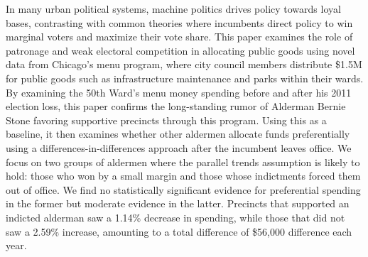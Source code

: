 \begin{spacing}{1.0}
    In many urban political systems, machine politics drives policy towards loyal bases, contrasting with common theories where incumbents direct policy to win marginal voters and maximize their vote share.
    This paper examines the role of patronage and weak electoral competition in allocating public goods using novel data from Chicago's menu program, where city council members distribute \$1.5M for public goods such as infrastructure maintenance and parks within their wards.
    By examining the 50th Ward's menu money spending before and after his 2011 election loss, this paper confirms the long-standing rumor of Alderman Bernie Stone favoring supportive precincts through this program.
    Using this as a baseline, it then examines whether other aldermen allocate funds preferentially using a differences-in-differences approach after the incumbent leaves office.
    We focus on two groups of aldermen where the parallel trends assumption is likely to hold: those who won by a small margin and those whose indictments forced them out of office.
    We find no statistically significant evidence for preferential spending in the former but moderate evidence in the latter.
    Precincts that supported an indicted alderman saw a 1.14\% decrease in spending, while those that did not saw a 2.59\% increase, amounting to a total difference of \$56,000 difference each year.
\end{spacing}
